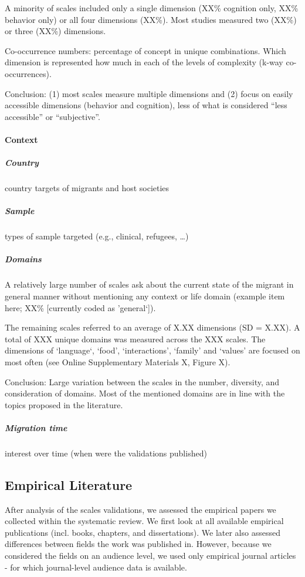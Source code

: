 \documentclass[man, 12pt, a4paper]{apa7}
\begin{document}
A minority of scales included only a single dimension (XX\% cognition only, XX\% behavior only) or all four dimensions (XX\%). Most studies measured two (XX\%) or three (XX\%) dimensions.

Co-occurrence numbers: percentage of concept in unique combinations. Which dimension is represented how much in each of the levels of complexity (k-way co-occurrences).

Conclusion: (1) most scales measure multiple dimensions and (2) focus on easily accessible dimensions (behavior and cognition), less of what is considered ``less accessible'' or ``subjective''.

\paragraph{Context}

\subparagraph{Country}
country targets of migrants and host societies

\subparagraph{Sample}
types of sample targeted (e.g., clinical, refugees, …)

\subparagraph{Domains}
A relatively large number of scales ask about the current state of the migrant in general manner without mentioning any context or life domain (example item here; XX\% [currently coded as 'general‘]).

The remaining scales referred to an average of X.XX dimensions (SD = X.XX). A total of XXX unique domains was measured across the XXX scales. The dimensions of ‘language‘, ‘food’, ‘interactions’, ‘family’ and ‘values’ are focused on most often (see Online Supplementary Materials X, Figure X).

Conclusion: Large variation between the scales in the number, diversity, and consideration of domains. Most of the mentioned domains are in line with the topics proposed in the literature.

\subparagraph{Migration time}
interest over time (when were the validations published)

\subsection{Empirical Literature}
After analysis of the scales validations, we assessed the empirical papers we collected within the systematic review. We first look at all available empirical publications (incl. books, chapters, and dissertations). We later also assessed differences between fields the work was published in. However, because we considered the fields on an audience level, we used only empirical journal articles - for which journal-level audience data is available.
\end{document}
